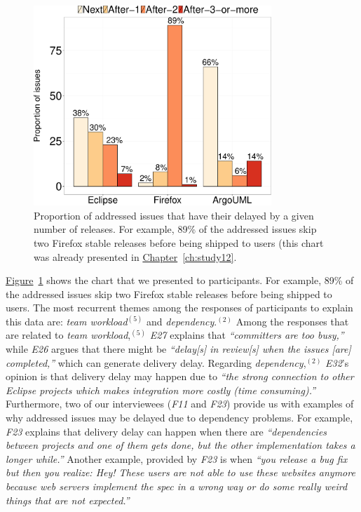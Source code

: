 \begin{figure}
	\centering
	\includegraphics[width=0.80\textwidth,keepaspectratio]
	{chapters/chapter5/figures/rq6/datasets.pdf}
	\caption{Proportion of addressed issues that have their \DIFdelbeginFL {}\DIFdelendFL \DIFaddbeginFL {}\DIFaddendFL delayed by a given number of releases. For example, 89\% of the
	addressed issues skip two Firefox stable releases before being shipped
to users (this chart was already presented in
\hyperref[ch:study12]{Chapter}~\ref{ch:study12}. }
	\label{fig:data-related-rq1}
\end{figure}

\hyperref[fig:data-related-rq1]{Figure}~\ref{fig:data-related-rq1} shows the
chart that we presented to participants. For example, 89\% of the addressed
issues skip two Firefox stable releases before being shipped to users. The most
recurrent themes among the responses of participants to explain this data are:
{\em team workload}$^{(5)}$ and {\em dependency}.$^{(2)}$ Among the responses
that are related to {\em team workload},$^{(5)}$ {\em E27} explains that {\em
``committers  are too busy,''} while {\em E26} argues that there might be {\em
``delay[s] in review[s] when the issues [are] completed,''} which can generate
delivery delay. Regarding {\em dependency},$^{(2)}$ {\em E32}'s opinion is that
delivery delay may happen due to {\em ``the strong connection to other Eclipse
projects which makes integration more costly (time consuming).''} Furthermore,
two of our interviewees ({\em F11} and {\em F23}) provide us with examples of
why addressed issues may be delayed due to dependency problems. For example,
{\em F23} explains \DIFdelbegin {}\DIFdelend that delivery delay can happen when there are {\em
``dependencies between projects and one of them gets done, but the other
implementation takes a longer while.''} Another example, provided by {\em F23}
is when {\em ``you release a bug fix but then you realize: Hey! These users are
	not able to use these websites anymore because web servers implement the
	spec in a wrong way or do some really weird things that are not
expected.''}

